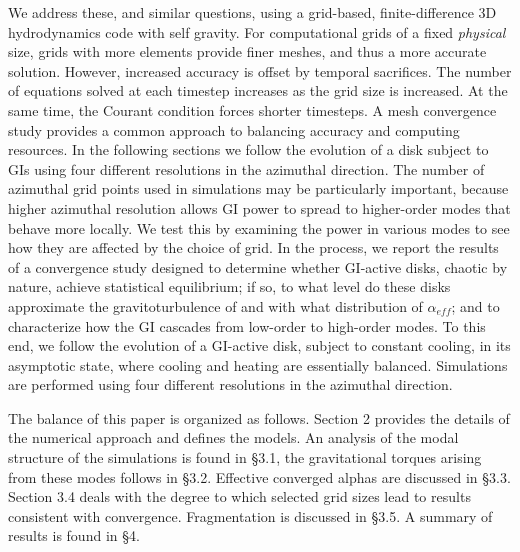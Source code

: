\documentclass[manuscript]{aastex} %
\begin{document}
We address these, and similar questions, using a grid-based, finite-difference 3D hydrodynamics code
with self gravity.
For computational grids of a fixed {\it physical} size,
grids with more elements provide finer meshes, and thus a more accurate solution. 
However, increased accuracy is offset by temporal sacrifices.
The number of equations solved at each timestep 
increases as the grid size is increased.  At the same time, the Courant condition 
forces shorter timesteps.  A mesh convergence study 
provides a common approach to balancing accuracy and computing resources.
In the following sections we follow the evolution of a disk subject to GIs
using four different
resolutions in the azimuthal direction.  The number of azimuthal grid points used in simulations
may be particularly important, because higher azimuthal resolution 
allows GI power to spread to higher-order modes 
that behave more locally. We test this by examining the power in various 
modes to see how they are affected by the choice of grid.
In the process, 
we report the results of a convergence study designed to determine whether GI-active disks, chaotic by nature, achieve statistical equilibrium; if so, to what level do these disks approximate the gravitoturbulence of \citet{gammie2001} and with what distribution of $\alpha_{eff}$; and to characterize how the GI cascades from low-order to high-order modes. To this end, we follow the evolution of a GI-active disk, subject to constant cooling, in its asymptotic state, where cooling and heating are essentially balanced.  Simulations are performed using four different resolutions in the azimuthal direction.  

The balance of this paper is organized as follows.  Section 2 provides the details of the numerical approach and defines the models.  An analysis of the modal structure of the simulations 
is found in \S3.1, the gravitational torques arising from these modes follows in \S3.2.  Effective converged alphas are 
discussed in \S3.3.  Section 3.4 deals with the degree to which selected grid sizes lead to results consistent with
convergence.  Fragmentation is discussed in \S3.5.  A summary of results is found in \S4.

\end{document}
